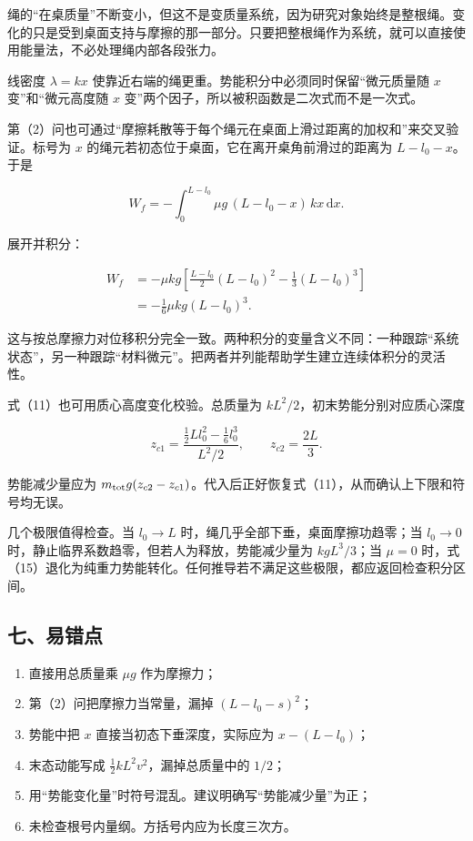 \documentclass[12pt,a4paper,UTF8]{ctexart}
\newcommand{\tightlist}{\setlength{\itemsep}{0pt}\setlength{\parskip}{0pt}}
\begin{document}
绳的``在桌质量''不断变小，但这不是变质量系统，因为研究对象始终是整根绳。变化的只是受到桌面支持与摩擦的那一部分。只要把整根绳作为系统，就可以直接使用能量法，不必处理绳内部各段张力。

线密度 \(\lambda=kx\)
使靠近右端的绳更重。势能积分中必须同时保留``微元质量随 \(x\)
变''和``微元高度随 \(x\)
变''两个因子，所以被积函数是二次式而不是一次式。

第（2）问也可通过``摩擦耗散等于每个绳元在桌面上滑过距离的加权和''来交叉验证。标号为
\(x\) 的绳元若初态位于桌面，它在离开桌角前滑过的距离为 \(L-l_0-x\)。于是

\[
W_f
=-\int_0^{L-l_0}
\mu g\,(L-l_0-x)\,kx\,\mathrm dx.
\]

展开并积分：

\[
\begin{aligned}
W_f
&=-\mu kg
\left[
\frac{L-l_0}{2}(L-l_0)^2
-\frac13(L-l_0)^3
\right]\\
&=-\frac16\mu kg(L-l_0)^3.
\end{aligned}
\]

这与按总摩擦力对位移积分完全一致。两种积分的变量含义不同：一种跟踪``系统状态''，另一种跟踪``材料微元''。把两者并列能帮助学生建立连续体积分的灵活性。

式（11）也可用质心高度变化校验。总质量为
\(kL^2/2\)，初末势能分别对应质心深度

\[
z_{c1}
=\frac{\frac12Ll_0^2-\frac16l_0^3}{L^2/2},
\qquad
z_{c2}=\frac{2L}{3}.
\]

势能减少量应为
\(m_{\rm tot}g(z_{c2}-z_{c1})\)。代入后正好恢复式（11），从而确认上下限和符号均无误。

几个极限值得检查。当 \(l_0\to L\) 时，绳几乎全部下垂，桌面摩擦功趋零；当
\(l_0\to0\) 时，静止临界系数趋零，但若人为释放，势能减少量为
\(kgL^3/3\)；当 \(\mu=0\)
时，式（15）退化为纯重力势能转化。任何推导若不满足这些极限，都应返回检查积分区间。

\subsection{七、易错点}\label{ux4e03ux6613ux9519ux70b9-2}

\begin{enumerate}
\def\labelenumi{\arabic{enumi}.}
\tightlist
\item
  直接用总质量乘 \(\mu g\) 作为摩擦力；
\item
  第（2）问把摩擦力当常量，漏掉 \((L-l_0-s)^2\)；
\item
  势能中把 \(x\) 直接当初态下垂深度，实际应为 \(x-(L-l_0)\)；
\item
  末态动能写成 \(\frac12kL^2v^2\)，漏掉总质量中的 \(1/2\)；
\item
  用``势能变化量''时符号混乱。建议明确写``势能减少量''为正；
\item
  未检查根号内量纲。方括号内应为长度三次方。
\end{enumerate}
\end{document}
